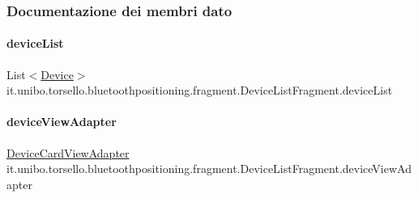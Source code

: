 \subsubsection{Documentazione dei membri dato}
\hypertarget{classit_1_1unibo_1_1torsello_1_1bluetoothpositioning_1_1fragment_1_1DeviceListFragment_a19a4a9cff961d3c319aaa80d5412a9a6_a19a4a9cff961d3c319aaa80d5412a9a6}{}\label{classit_1_1unibo_1_1torsello_1_1bluetoothpositioning_1_1fragment_1_1DeviceListFragment_a19a4a9cff961d3c319aaa80d5412a9a6_a19a4a9cff961d3c319aaa80d5412a9a6} 
\paragraph{\texorpdfstring{device\+List}{deviceList}}
{\footnotesize\ttfamily List$<$\hyperlink{classit_1_1unibo_1_1torsello_1_1bluetoothpositioning_1_1model_1_1Device}{Device}$>$ it.\+unibo.\+torsello.\+bluetoothpositioning.\+fragment.\+Device\+List\+Fragment.\+device\+List\hspace{0.3cm}{\ttfamily [private]}}

\hypertarget{classit_1_1unibo_1_1torsello_1_1bluetoothpositioning_1_1fragment_1_1DeviceListFragment_af33bdf009badab587a755e2e40dc4bc5_af33bdf009badab587a755e2e40dc4bc5}{}\label{classit_1_1unibo_1_1torsello_1_1bluetoothpositioning_1_1fragment_1_1DeviceListFragment_af33bdf009badab587a755e2e40dc4bc5_af33bdf009badab587a755e2e40dc4bc5} 
\paragraph{\texorpdfstring{device\+View\+Adapter}{deviceViewAdapter}}
{\footnotesize\ttfamily \hyperlink{classit_1_1unibo_1_1torsello_1_1bluetoothpositioning_1_1adapter_1_1DeviceCardViewAdapter}{Device\+Card\+View\+Adapter} it.\+unibo.\+torsello.\+bluetoothpositioning.\+fragment.\+Device\+List\+Fragment.\+device\+View\+Adapter\hspace{0.3cm}{\ttfamily [private]}}

